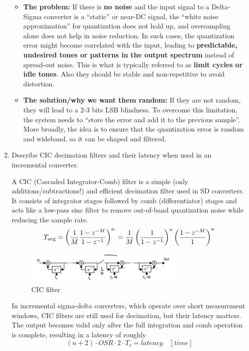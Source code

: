 \documentclass[
  a4paper,
]{article}
\begin{document}
\begin{enumerate}
  \begin{itemize}
  \item
    \textbf{The problem:} If there is \textbf{no noise} and the input
    signal to a Delta-Sigma converter is a ``static'' or near-DC signal,
    the ``white noise approximation'' for quantization does not hold up,
    and oversampling alone does not help in noise reduction. In such
    cases, the quantization error might become correlated with the
    input, leading to \textbf{predictable, undesired tones or patterns
    in the output spectrum} instead of spread-out noise. This is what is
    typically referred to as \textbf{limit cycles or idle tones}. Also
    they should be stable and non-repetitive to avoid distortion.
  \item
    \textbf{The solution/why we want them random:} If they are not
    random, they will lead to a 2-3 bits LSB blindness. To overcome this
    limitation, the system needs to ``store the error and add it to the
    previous sample''. More broadly, the idea is to ensure that the
    quantization error is random and wideband, so it can be shaped and
    filtered.
  \end{itemize}
\item
  Describe CIC decimation filters and their latency when used in an
  incremental converter.

  A CIC (Cascaded Integrator-Comb) filter is a simple (only
  additions/subtractions!) and efficient decimation filter used in SD
  converters. It consists of integrator stages followed by comb
  (differentiator) stages and acts like a low-pass sinc filter to remove
  out-of-band quantization noise while reducing the sample rate.
  \[T_{\text{avg}} = \left( \frac{1}{M} \frac{1 - z^{-M}}{1 - z^{-1}} \right)^{n} \\ = \frac{1}{M} \left( \frac{1}{1 - z^{-1}} \right)^{n} \left( \frac{1 - z^{-M}}{1} \right)^{n}\]

  \begin{figure}
  \centering
  \includegraphics[width=0.75\textwidth,height=\textheight]{image-5.png}
  \caption{CIC filter}
  \end{figure}

  In incremental sigma-delta converters, which operate over short
  measurement windows, CIC filters are still used for decimation, but
  their latency matters. The output becomes valid only after the full
  integration and comb operation is complete, resulting in a latency of
  roughly \[ (n+2) \cdot OSR \cdot 2\cdot  T_s=latency \quad [time]\]


\end{enumerate}
\end{document}
